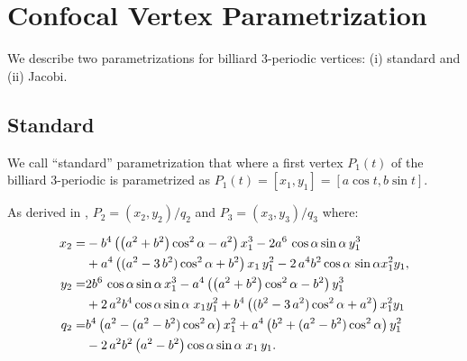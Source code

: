 \section{Confocal Vertex Parametrization}
\label{sec:02-vertex-para}
We describe two parametrizations for billiard 3-periodic vertices: (i) standard and (ii) Jacobi.

\subsection{Standard}
\label{sec:02-confocal-standard-param}

We call ``standard'' parametrization that where a first vertex $P_1(t)$ of the billiard 3-periodic is parametrized as $P_1(t)=[x_1,y_1]=[a\cos{t},b\sin{t}]$.

As derived in \cite{garcia2019-incenter}, $P_2=(x_2,y_2)/q_2$ and $P_3=(x_3,y_3)/q_3$ where:

 \begin{equation}
 \label{eq:02-p2}
 \aligned 
x_{2}=&-{b}^{4} \left(  \left(   a^2+{b}^{2}\right)\cos^{2}\alpha   -{a}^{2}  \right) x_1^{3}-2{a}^{6} \,\cos  \alpha  \sin   \alpha  \, y_1^{3}\\
&+{a}^{4} \left(  ({a
}^{2}-3\, {b}^{2}) \cos^{2} \alpha  +{b}^{2}
 \right) {x_1}\,y_1^{2}-2\,{a}^{4}{b}^{2} \cos \alpha  \,\sin  \alpha    x_1^{2}{y_1},
\\
y_{2}=& 2{b}^{6} \,\cos \alpha\sin \alpha\,   x_1^{3}-{
a}^{4}  \left(  \left(   a^2+{b}^{2}\right)\cos^{2}  \alpha  -{b}^{2}  \right)  y_1^{3}\\
&+  2\,{a}^{2} {b}^{4}\cos \alpha \sin
  \alpha \; {x_1} y_1^{2} +{b}^{4}\left(  ({b
 }^{2}-3\, {a}^{2}) \cos^{2} \alpha  +{a}^{2}
  \right) x_1^{2}{y_1}
\\
q_2=&{b}^{4} \left( a^2-(a^2-b^2)\cos^2  \alpha   \right)
x_1^{2}+{a}^{4} \left(  {b}^{2}+(a^2-b^2)\cos^2 \alpha  
 \right) y_1^{2}\\
 & - 2\, {a}^{2}{b}^{2} \left({a}^{2} -{b}^{2} \right)\cos \alpha\sin \alpha \; {x_1}\,{
y_1}.
\endaligned
%
\end{equation}

